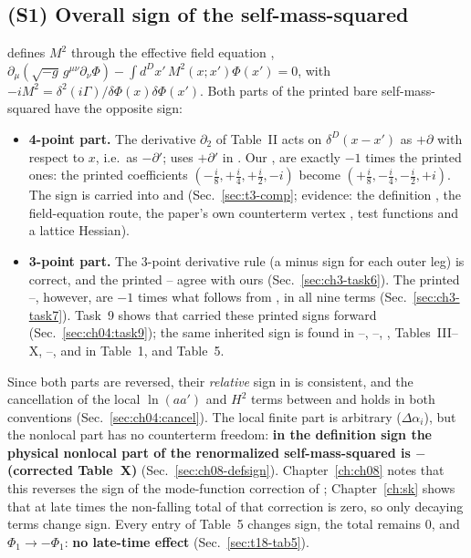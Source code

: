 \subsection*{(S1) Overall sign of the self-mass-squared}
\begin{discbox}
\PI{} defines $M^2$ through the effective field equation ,
$\partial_\mu(\sqrt{-g}\,g^{\mu\nu}\partial_\nu\Phi)-\int d^Dx'\,M^2(x;x')\Phi(x')=0$, with $-iM^2=\delta^2(i\Gamma)/\delta\Phi(x)\delta\Phi(x')$.
Both parts of the printed bare self-mass-squared have the opposite sign:
\begin{itemize}[leftmargin=14pt,itemsep=1pt]
\item \textbf{4-point part.} The derivative $\partial_2$ of Table~II acts on $\delta^D(x-x')$ as $+\partial$ with respect to $x$, i.e.\ as $-\partial'$;
\PI{} uses $+\partial'$ in . Our ,  are exactly $-1$ times the printed ones: the printed coefficients
$(-\tfrac i8,+\tfrac i4,+\tfrac i2,-i)$ become $(+\tfrac i8,-\tfrac i4,-\tfrac i2,+i)$. The sign is carried into  and 
(Sec.~\ref{sec:t3-comp}; evidence: the definition , the field-equation route, the paper's own counterterm vertex , test functions and a
lattice Hessian).
\item \textbf{3-point part.} The 3-point derivative rule (a minus sign for each outer leg) is correct, and the printed -- agree with ours
(Sec.~\ref{sec:ch3-task6}). The printed --, however, are $-1$ times what follows from , in all nine terms
(Sec.~\ref{sec:ch3-task7}). Task~9 shows that \PI{} carried these printed signs forward (Sec.~\ref{sec:ch04:task9}); the same inherited sign is found in
--, --, , Tables~III--X, --, and in \PII{} Table~1,  and Table~5.
\end{itemize}
Since both parts are reversed, their \emph{relative} sign in \PI{} is consistent, and the cancellation of the local $\ln(aa')$ and $H^2$ terms between
 and  holds in both conventions (Sec.~\ref{sec:ch04:cancel}). The local finite part is arbitrary ($\Delta\alpha_i$), but the
nonlocal part has no counterterm freedom: \textbf{in the definition sign the physical nonlocal part of the renormalized self-mass-squared is
$-$(corrected Table~X)} (Sec.~\ref{sec:ch08-defsign}). Chapter~\ref{ch:ch08} notes that this reverses the sign of the mode-function correction of
\PII; Chapter~\ref{ch:sk} shows that at late times the non-falling total of that correction is zero, so only decaying terms change sign. Every entry of
Table~5 changes sign, the total remains $0$, and $\Phi_1\to-\Phi_1$: \textbf{no late-time effect} (Sec.~\ref{sec:t18-tab5}).
\end{discbox}

